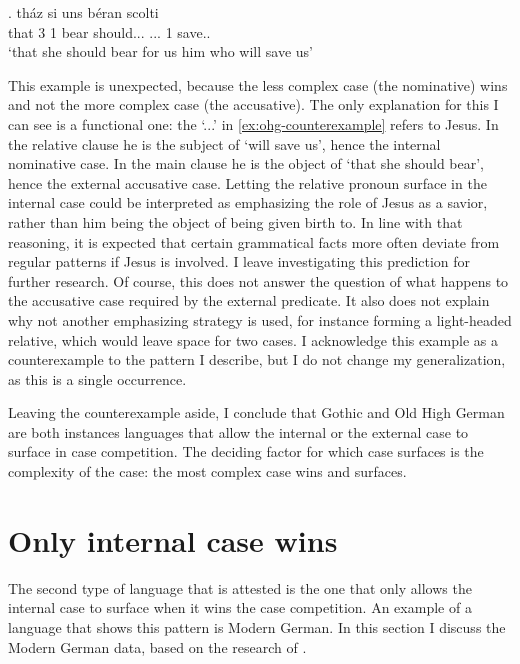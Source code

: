 \exg. tház si uns béran scolti   \\
 that 3 1 bear\scsub{[acc]} should... ... 1 save..\scsub{[nom]}\\
 `that she should bear for us him who will save us' \label{ex:ohg-counterexample}

This example is unexpected, because the less complex case (the nominative) wins and not the more complex case (the accusative).
The only explanation for this I can see is a functional one: the  `...' in \ref{ex:ohg-counterexample} refers to Jesus. In the relative clause he is the subject of  `will save us', hence the internal nominative case. In the main clause he is the object of  `that she should bear', hence the external accusative case.
Letting the relative pronoun surface in the internal case could be interpreted as emphasizing the role of Jesus as a savior, rather than him being the object of being given birth to. In line with that reasoning, it is expected that certain grammatical facts more often deviate from regular patterns if Jesus is involved. I leave investigating this prediction for further research.
Of course, this does not answer the question of what happens to the accusative case required by the external predicate. It also does not explain why not another emphasizing strategy is used, for instance forming a light-headed relative, which would leave space for two cases.
I acknowledge this example as a counterexample to the pattern I describe, but I do not change my generalization, as this is a single occurrence.

Leaving the counterexample aside, I conclude that Gothic and Old High German are both instances languages that allow the internal or the external case to surface in case competition. The deciding factor for which case surfaces is the complexity of the case: the most complex case wins and surfaces.


\section{Only internal case wins}

The second type of language that is attested is the one that only allows the internal case to surface when it wins the case competition. An example of a language that shows this pattern is Modern German. In this section I discuss the Modern German data, based on the research of \cite{vogel2001}.

